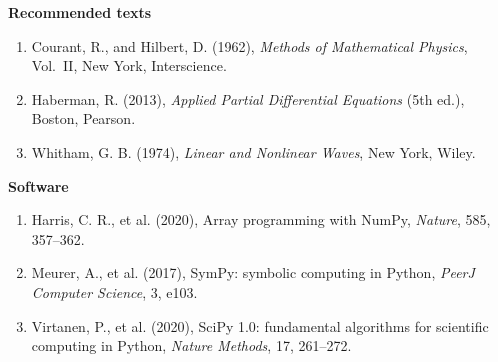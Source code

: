 \documentclass[11pt,a4paper]{article}
\numberwithin{equation}{section}
\theoremstyle{definition}
\newcommand{\subhead}[1]{%
  \par\medskip\noindent\textbf{#1}\par\nobreak\smallskip}
\begin{document}
\subhead{Recommended texts}
\begin{enumerate}
\item Courant, R., and Hilbert, D. (1962), \emph{Methods of Mathematical Physics}, Vol.~II, New York, Interscience.
\item Haberman, R. (2013), \emph{Applied Partial Differential Equations} (5th ed.), Boston, Pearson.
\item Whitham, G. B. (1974), \emph{Linear and Nonlinear Waves}, New York, Wiley.
\end{enumerate}

\subhead{Software}
\begin{enumerate}
\item Harris, C. R., et al. (2020), Array programming with NumPy, \emph{Nature}, 585, 357--362.
\item Meurer, A., et al. (2017), SymPy: symbolic computing in Python, \emph{PeerJ Computer Science}, 3, e103.
\item Virtanen, P., et al. (2020), SciPy 1.0: fundamental algorithms for scientific computing in Python, \emph{Nature Methods}, 17, 261--272.
\end{enumerate}
\end{document}
